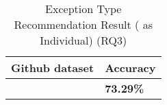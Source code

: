 \begin{table}[t]%
  \caption{Exception Type Recommendation Result ({\xtype} as Individual) (RQ3)}
  \vspace{-12pt}
  \small
	\begin{center}
		\renewcommand{\arraystretch}{1}
		\begin{tabular}{| p{3.05cm}<{\centering} | p{1.2cm}<{\centering}|}
		  \hline
			Github dataset  & Accuracy \\
			\hline
			\xtype   & \textbf{73.29\%} \\
			\hline
		\end{tabular}
		\label{tab:xtype-3}
	\end{center}
\end{table}